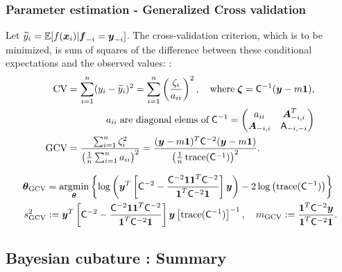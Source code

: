 \documentclass[handout, 10pt,compress,xcolor={usenames,dvipsnames}]{beamer} %
\newcommand{\bm}[1]{\boldsymbol{#1}}
\newcommand{\Ex}{\mathbb{E}}
\newcommand{\GCV}{\textup{GCV}}
\renewcommand{\ty}{\widetilde{y}}
\renewcommand{\vtheta}{{\bm{\theta}}}
\newcommand{\pause}{}
\begin{document}
\begin{frame}
\frametitle{Parameter estimation - Generalized Cross validation}
\vspace*{-6ex}
Let $\ty_i = \Ex[f(\vx_i ) | \vf_{-i} = \vy_{-i}]$.
The cross-validation criterion, which is to be minimized, is sum of squares of the difference between these conditional expectations and the observed values: :
\vspace*{-2.0ex}
\begin{align*}
\textup{CV} &= \sum_{i=1}^n (y_i - \ty_i)^2 = \sum_{i=1}^n \left(\frac{\zeta_i }{a_{ii}} \right)^2, \quad \text{where}\; \bm{\zeta} = \mC^{-1}(\vy - m \vone), 
\\
& \qquad \qquad a_{ii} \; \text{are diagonal elems of} \; \mC^{-1} = \begin{pmatrix} a_{ii}  & \vA_{-i,i}^T \\  \vA_{-i,i} & \mA_{-i,-i}\end{pmatrix}
\\
\GCV &
= \frac{\sum_{i=1}^n\zeta_i^2}{\left(\frac 1n \sum_{i=1}^n a_{ii} \right)^2} 
= \frac{(\vy - m\vone)^T \mC^{-2} (\vy - m \vone)}{\left(\frac 1n \trace(\mC^{-1}) \right)^2}.
\end{align*}
\pause
\vspace{-2ex}
\begin{align*}
\vtheta_{\GCV} &= \argmin_{\vtheta} \left\{\log \left(  \vy^T \left[\mC^{-2} - \frac{\mC^{-2} \vone \vone^T \mC^{-2}}{\vone^T \mC^{-2} \vone}  \right] \vy \right)  
- 2 \log \left ( \trace(\mC^{-1}) \right ) \right\}
\\
s^2_{\GCV} & : = \vy^T \left[\mC^{-2} - \frac{\mC^{-2} \vone \vone^T \mC^{-2}}{\vone^T \mC^{-2} \vone}  \right] \vy  \left[ \trace(\mC^{-1}) \right]^{-1}, 
\quad m_{\GCV} := \frac{\vone^T \mC^{-2} \vy}{\vone^T \mC^{-2} \vone}. 
\end{align*}
\end{frame}





\iffalse

\subsection{Bayesian cubature : Summary}
\end{document}

